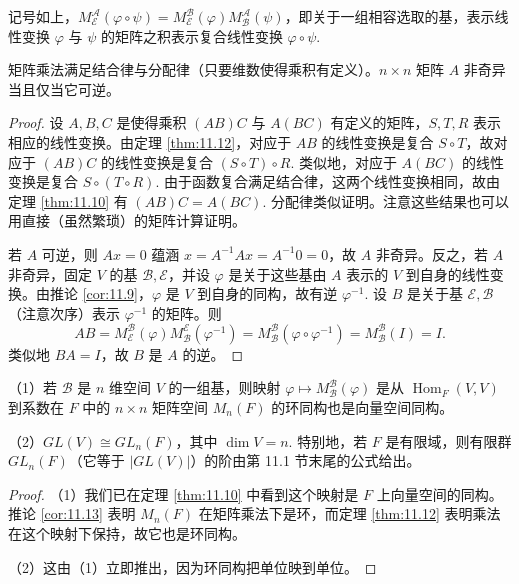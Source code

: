 \begin{theorem}\label{thm:11.12}
记号如上，\(M_{\mathcal{E}}^{\mathcal{A}}(\varphi \circ \psi) = M_{\mathcal{E}}^{\mathcal{B}}(\varphi)M_{\mathcal{B}}^{\mathcal{A}}(\psi)\)，即关于一组相容选取的基，表示线性变换 \(\varphi\) 与 \(\psi\) 的矩阵之积表示复合线性变换 \(\varphi \circ \psi\).
\end{theorem}

\begin{corollary}\label{cor:11.13}
矩阵乘法满足结合律与分配律（只要维数使得乘积有定义）。\(n \times n\) 矩阵 \(A\) 非奇异当且仅当它可逆。
\end{corollary}

\begin{proof}
设 \(A, B, C\) 是使得乘积 \((AB)C\) 与 \(A(BC)\) 有定义的矩阵，\(S, T, R\) 表示相应的线性变换。由定理 \ref{thm:11.12}，对应于 \(AB\) 的线性变换是复合 \(S \circ T\)，故对应于 \((AB)C\) 的线性变换是复合 \((S \circ T) \circ R\). 类似地，对应于 \(A(BC)\) 的线性变换是复合 \(S \circ (T \circ R)\). 由于函数复合满足结合律，这两个线性变换相同，故由定理 \ref{thm:11.10} 有 \((AB)C = A(BC)\). 分配律类似证明。注意这些结果也可以用直接（虽然繁琐）的矩阵计算证明。

若 \(A\) 可逆，则 \(Ax = 0\) 蕴涵 \(x = A^{-1}Ax = A^{-1}0 = 0\)，故 \(A\) 非奇异。反之，若 \(A\) 非奇异，固定 \(V\) 的基 \(\mathcal{B}, \mathcal{E}\)，并设 \(\varphi\) 是关于这些基由 \(A\) 表示的 \(V\) 到自身的线性变换。由推论 \ref{cor:11.9}，\(\varphi\) 是 \(V\) 到自身的同构，故有逆 \(\varphi^{-1}\). 设 \(B\) 是关于基 \(\mathcal{E}, \mathcal{B}\)（注意次序）表示 \(\varphi^{-1}\) 的矩阵。则
\[
AB = M_{\mathcal{E}}^{\mathcal{B}}(\varphi)M_{\mathcal{B}}^{\mathcal{E}}(\varphi^{-1}) = M_{\mathcal{B}}^{\mathcal{B}}(\varphi \circ \varphi^{-1}) = M_{\mathcal{B}}^{\mathcal{B}}(I) = I.
\]
类似地 \(BA = I\)，故 \(B\) 是 \(A\) 的逆。
\end{proof}

\begin{corollary}\label{cor:11.14}
（1）若 \(\mathcal{B}\) 是 \(n\) 维空间 \(V\) 的一组基，则映射 \(\varphi \mapsto M_{\mathcal{B}}^{\mathcal{B}}(\varphi)\) 是从 \(\operatorname{Hom}_F(V, V)\) 到系数在 \(F\) 中的 \(n \times n\) 矩阵空间 \(M_n(F)\) 的环同构也是向量空间同构。

（2）\(GL(V) \cong GL_n(F)\)，其中 \(\dim V = n\). 特别地，若 \(F\) 是有限域，则有限群 \(GL_n(F)\)（它等于 \(|GL(V)|\)）的阶由第 11.1 节末尾的公式给出。
\end{corollary}

\begin{proof}
（1）我们已在定理 \ref{thm:11.10} 中看到这个映射是 \(F\) 上向量空间的同构。推论 \ref{cor:11.13} 表明 \(M_n(F)\) 在矩阵乘法下是环，而定理 \ref{thm:11.12} 表明乘法在这个映射下保持，故它也是环同构。

（2）这由（1）立即推出，因为环同构把单位映到单位。
\end{proof}

